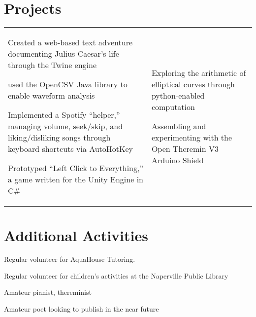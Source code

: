 \documentclass[10pt, letterpaper]{article}
\begin{document}

\vspace{-32pt}
\section*{Projects}
\vspace{-8pt}

\begin{center}
	\begin{tabularx}{\textwidth}[t]{X X}
		
		\begin{description}
			\item [Prior Projects] Created a web-based text adventure documenting Julius Caesar's life through the Twine engine
			\item used the OpenCSV Java library to enable waveform analysis 
			\item Implemented a Spotify ``helper,'' managing volume, seek/skip, and liking/disliking songs through keyboard shortcuts via AutoHotKey
			\item Prototyped ``Left Click to Everything,'' a game written for the Unity Engine in C\#
		\end{description}
		&
		
		\begin{description}
			\item [Ongoing Projects] Exploring the arithmetic of elliptical curves through python-enabled computation
			\item Assembling and experimenting with the Open Theremin V3 Arduino Shield
			\item 
		\end{description}
	\end{tabularx}
\end{center}

\section*{Additional Activities}
\vspace{-18pt}

\begin{center}
	\begin{multicols}{2}
		\begin{description}
			\item Regular volunteer for AquaHouse Tutoring.  
			\item Regular volunteer for children's activities at the Naperville Public Library
			\item Amateur pianist, thereminist
			\item Amateur poet looking to publish in the near future
		\end{description}	
	\end{multicols}
\end{center}
\end{document}

